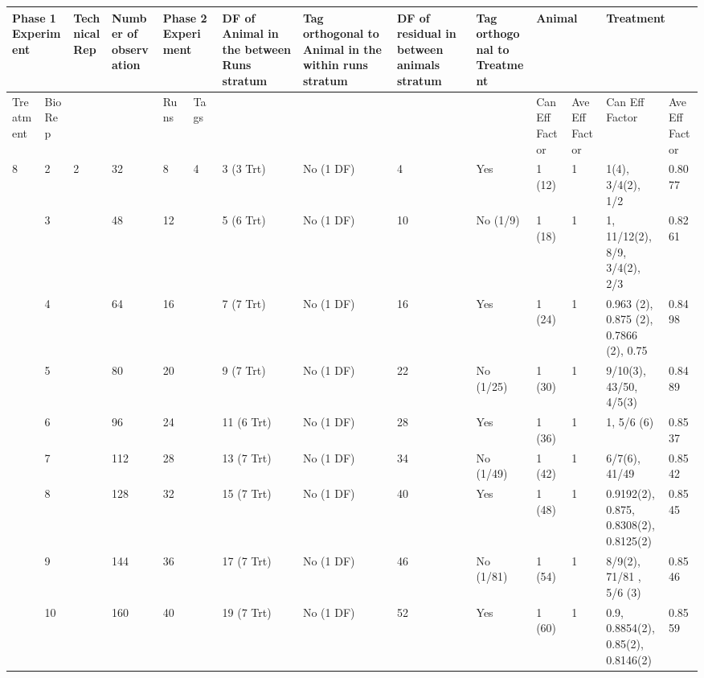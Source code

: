 \noindent \eject 

\begin{tabular}{|p{0.5in}|p{0.3in}|p{0.5in}|p{0.7in}|p{0.3in}|p{0.3in}|p{0.7in}|p{0.7in}|p{0.6in}|p{0.6in}|p{0.4in}|p{0.4in}|p{0.6in}|p{0.4in}|} \hline 
\multicolumn{2}{|p{1in}|}{Phase 1 Experiment} & Technical Rep & Number of observation  & \multicolumn{2}{|p{0.7in}|}{Phase 2 Experiment} & DF of Animal in the between Runs stratum  & Tag orthogonal to Animal in the within runs stratum & DF of residual in between animals stratum & Tag orthogonal to Treatment & \multicolumn{2}{|p{0.8in}|}{Animal} & \multicolumn{2}{|p{1.0in}|}{Treatment} \\ \hline 
Treatment & Bio Rep &  &  & Runs & Tags  &  &  &  &  & Can Eff Factor & Ave Eff Factor & Can Eff Factor & Ave Eff Factor \\ \hline 
8 & 2 & 2 & 32 & 8 & 4 & 3 (3 Trt) & No (1 DF) & 4 & Yes & 1 (12) & 1 & 1(4), 3/4(2), 1/2 & 0.8077 \\ \hline 
 & 3 &  & 48 & 12 &  & 5 (6 Trt) & No (1 DF) & 10 & No (1/9) & 1 (18) & 1 & 1,  11/12(2), 8/9, 3/4(2),  2/3 & 0.8261 \\ \hline 
 & 4 &  & 64 & 16 &  & 7 (7 Trt) & No (1 DF) & 16 & Yes & 1 (24) & 1 & 0.963 (2), 0.875 (2), 0.7866 (2), 0.75 & 0.8498 \\ \hline 
 & 5 &  & 80 & 20 &  & 9 (7 Trt) & No (1 DF) & 22 & No (1/25) & 1 (30) & 1 & 9/10(3), 43/50,  4/5(3) & 0.8489 \\ \hline 
 & 6 &  & 96 & 24 &  & 11 (6 Trt) & No (1 DF) & 28 & Yes & 1 (36) & 1 & 1, 5/6 (6) & 0.8537 \\ \hline 
 & 7 &  & 112 & 28 &  & 13 (7 Trt) & No (1 DF) & 34 & No (1/49) & 1 (42) & 1 & 6/7(6), 41/49 & 0.8542 \\ \hline 
 & 8 &  & 128 & 32 &  & 15 (7 Trt) & No (1 DF) & 40 & Yes & 1 (48) & 1 & 0.9192(2), 0.875, 0.8308(2), 0.8125(2)  & 0.8545 \\ \hline 
 & 9 &  & 144 & 36 &  & 17 (7 Trt) & No (1 DF) & 46 & No (1/81) & 1 (54) & 1 & 8/9(2), 71/81 ,   5/6 (3) & 0.8546 \\ \hline 
 & 10 &  & 160 & 40 &  & 19 (7 Trt) & No (1 DF) & 52 & Yes & 1 (60) & 1 & 0.9, 0.8854(2), 0.85(2), 0.8146(2)  & 0.8559 \\ \hline 
\end{tabular}

\eject 

